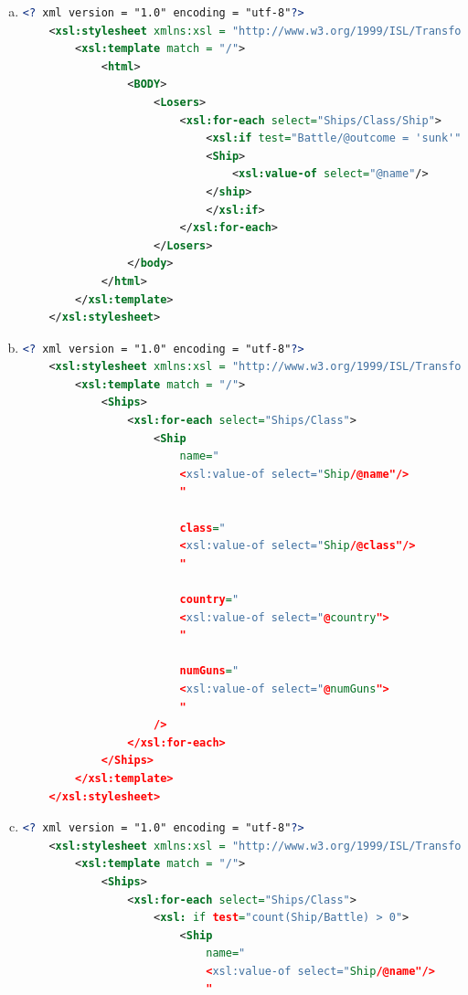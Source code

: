 \documentclass[12pt]{article}
\begin{document}
\begin{enumerate}[1.]
\begin{enumerate}[a)]
        \item

    \begin{lstlisting}[language=XML]
    <? xml version = "1.0" encoding = "utf-8"?>
    <xsl:stylesheet xmlns:xsl = "http://www.w3.org/1999/ISL/Transform">
        <xsl:template match = "/">
            <html>
                <BODY>
                    <Losers>
                        <xsl:for-each select="Ships/Class/Ship">
                            <xsl:if test="Battle/@outcome = 'sunk'">
                            <Ship>
                                <xsl:value-of select="@name"/>
                            </ship>
                            </xsl:if>
                        </xsl:for-each>
                    </Losers>
                </body>
            </html>
        </xsl:template>
    </xsl:stylesheet>
    \end{lstlisting}

        \item

    \begin{lstlisting}[language=XML]
    <? xml version = "1.0" encoding = "utf-8"?>
    <xsl:stylesheet xmlns:xsl = "http://www.w3.org/1999/ISL/Transform">
        <xsl:template match = "/">
            <Ships>
                <xsl:for-each select="Ships/Class">
                    <Ship
                        name="
                        <xsl:value-of select="Ship/@name"/>
                        "

                        class="
                        <xsl:value-of select="Ship/@class"/>
                        "

                        country="
                        <xsl:value-of select="@country">
                        "

                        numGuns="
                        <xsl:value-of select="@numGuns">
                        "
                    />
                </xsl:for-each>
            </Ships>
        </xsl:template>
    </xsl:stylesheet>
    \end{lstlisting}

        \item

    \begin{lstlisting}[language=XML]
    <? xml version = "1.0" encoding = "utf-8"?>
    <xsl:stylesheet xmlns:xsl = "http://www.w3.org/1999/ISL/Transform">
        <xsl:template match = "/">
            <Ships>
                <xsl:for-each select="Ships/Class">
                    <xsl: if test="count(Ship/Battle) > 0">
                        <Ship
                            name="
                            <xsl:value-of select="Ship/@name"/>
                            "


\end{lstlisting}
\end{enumerate}
\end{enumerate}
\end{document}
